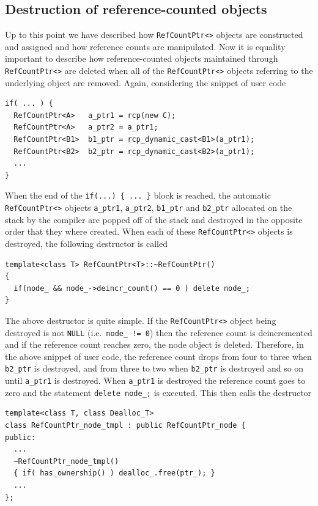 %
\subsection{Destruction of reference-counted objects}
%

Up to this point we have described how {}\texttt{Ref\-Count\-Ptr<>}
objects are constructed and assigned and how reference counts are
manipulated.  Now it is equality important to describe how
reference-counted objects maintained through
{}\texttt{Ref\-Count\-Ptr<>} are deleted when all of the
{}\texttt{Ref\-Count\-Ptr<>} objects referring to the underlying
object are removed.  Again, considering the snippet of user code

{\scriptsize\begin{verbatim}
if( ... ) {
  RefCountPtr<A>   a_ptr1 = rcp(new C);
  RefCountPtr<A>   a_ptr2 = a_ptr1;
  RefCountPtr<B1>  b1_ptr = rcp_dynamic_cast<B1>(a_ptr1);
  RefCountPtr<B2>  b2_ptr = rcp_dynamic_cast<B2>(a_ptr1);
  ...
}
\end{verbatim}}

When the end of the {}\texttt{if(...) \{ ... \}} block is reached, the
automatic {}\texttt{RefCountPtr<>} objects {}\texttt{a\_ptr1},
{}\texttt{a\_ptr2}, {}\texttt{b1\_ptr} and {}\texttt{b2\_ptr}
allocated on the stack by the compiler are popped off of the stack and
destroyed in the opposite order that they where created.  When each of
these {}\texttt{RefCountPtr<>} objects is destroyed, the following
destructor is called

{\scriptsize\begin{verbatim}
template<class T> RefCountPtr<T>::~RefCountPtr()
{
  if(node_ && node_->deincr_count() == 0 ) delete node_;
}
\end{verbatim}}

{}\noindent{}The above destructor is quite simple.  If the
{}\texttt{RefCountPtr<>} object being destroyed is not {}\texttt{NULL}
(i.e.~{}\texttt{node\_ != 0}) then the reference count is
deincremented and if the reference count reaches zero, the node object
is deleted.  Therefore, in the above snippet of user code, the
reference count drops from four to three when {}\texttt{b2\_ptr} is
destroyed, and from three to two when {}\texttt{b2\_ptr} is destroyed
and so on until {}\texttt{a\_ptr1} is destroyed.  When
{}\texttt{a\_ptr1} is destroyed the reference count goes to zero and
the statement {}\texttt{delete node\_;} is executed.  This then calls
the destructor

{\scriptsize\begin{verbatim}
template<class T, class Dealloc_T>
class RefCountPtr_node_tmpl : public RefCountPtr_node {
public:
  ...
  ~RefCountPtr_node_tmpl()
  { if( has_ownership() ) dealloc_.free(ptr_); }
  ...
};
\end{verbatim}}

